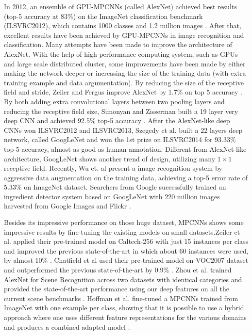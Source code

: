 In 2012, an ensemble of GPU-MPCNNs (called AlexNet) achieved best results (top-5 accuracy at 83\%) on the ImageNet classification benchmark (ILSVRC2012), which contains 1000 classes and 1.2 million images \cite{krizhevsky2012imagenet}. After that, excellent results have been achieved by GPU-MPCNNs in image recognition and classification. Many attempts have been made to improve the architecture of AlexNet. With the help of high performance computing system, such as GPUs and large scale distributed cluster, some improvements have been made by either making the network deeper or increasing the size of the training data  (with extra training example and data argumentation). By reducing the size of the receptive field and stride, Zeiler and Fergus improve AlexNet by 1.7\% on top 5 accuracy \cite{zeiler2014visualizing}. By both adding extra convolutional layers between two pooling layers and reducing the receptive field size, Simonyan and Zisserman built a 19 layer very deep CNN and achieved 92.5\% top-5 accuracy \cite{simonyan2014very}. After the AlexNet-like deep CNNs won ILSVRC2012 and ILSVRC2013, Szegedy et al. built a 22 layers deep network, called GoogLeNet and won the 1st prize on ILSVRC2014 for 93.33\% top-5 accuracy, almost as good as human annotation\cite{szegedy2014going}. Different from AlexNet-like architecture, GoogLeNet shows another trend of design, utilizing many $1\times 1$ receptive field. Recently, Wu et. al present a image recognition system by aggressive data augmentation on the training data, achieving a top-5 error rate of 5.33\% on ImageNet dataset\cite{wu2015deep}. Searchers from Google successfully trained an ingredient detector system based on GoogLeNet with 220 million images harvested from Google Images and Flickr \cite{malmaud2015s}.  

Besides its impressive performance on those huge dataset, MPCNNs shows some impressive results by fine-tuning the existing models on small datasets.Zeiler et al. applied their pre-trained model on Caltech-256 with just 15 instances per class and improved the previous state-of-the-art in which about 60 instances were used, by almost 10\% \cite{zeiler2014visualizing}. Chatfield et al used their pre-trained model on VOC2007 dataset and outperformed the previous state-of-the-art by 0.9\% \cite{Chatfield14}. Zhou et al. trained AlexNet for Scene Recognition across two datasets with identical categories and provided the state-of-the-art performance using our deep features on all the current scene benchmarks \cite{NIPS2014_Zhou}. Hoffman et al. fine-tuned a MPCNNs trained from ImageNet with one example per class, showing that it is possible to use a hybrid approach where one uses different feature representations for the various domains
and produces a combined adapted model \cite{hoffman2013one}.
 

